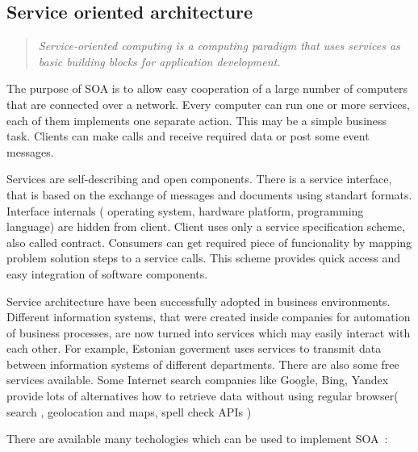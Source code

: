 \subsection{Service oriented architecture}
\begin{quote}
\textit{
Service-oriented computing is a computing paradigm that uses services as basic building blocks for
application development.}
~\cite {lws_milanovic.pdf}
\end{quote} 

The purpose of \gls{SOA} is to allow easy cooperation of a large number of
computers that are connected over a network.
Every computer can run one or more services, each of them implements one
separate action. This may be a simple business task. Clients can make calls
and receive required data or post some event messages.

Services are self-describing and open components. There is a service interface,
that is based on the exchange of messages and documents using standart formats.
Interface internals ( operating system, hardware platform, programming language)
are hidden from client. Client uses only a service specification scheme, also
called contract. Consumers can get required piece of funcionality by mapping problem
solution steps to a service calls. This scheme provides quick access and easy integration of software components.


Service architecture have been successfully adopted in
business environments. Different information systems, that were created inside
companies for automation of business processes,  are now turned into services
which may easily interact with each other. For example, Estonian goverment uses
services to transmit data between information systems of different departments.
There are also some free services available. Some Internet search companies like
Google, Bing, Yandex provide lots of alternatives how to retrieve data without
using regular browser( search , geolocation and maps,  spell check \gls{API}s )

There are available many techologies which can be used to implement
\gls{SOA}~\cite{wikipedia:SOA}:

